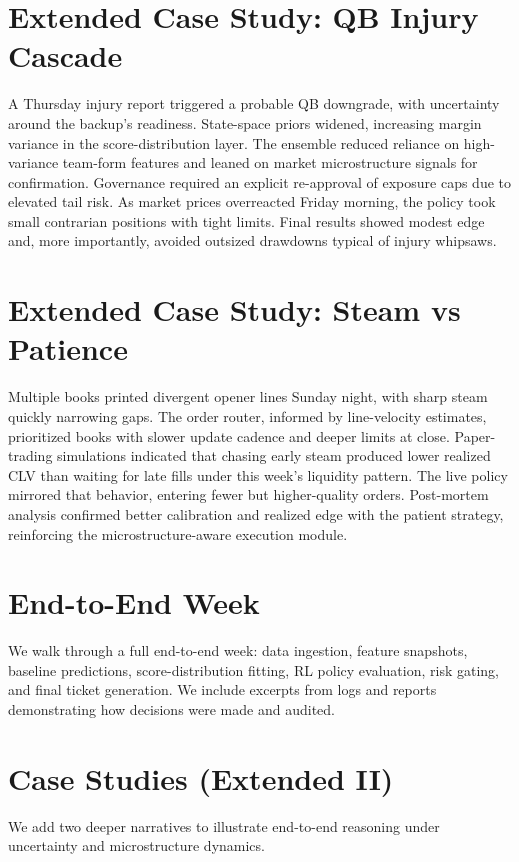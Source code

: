 \section{Extended Case Study: QB Injury Cascade}\label{app:cases-injury}
A Thursday injury report triggered a probable QB downgrade, with uncertainty around the backup's readiness. State-space priors widened, increasing margin variance in the score-distribution layer. The ensemble reduced reliance on high-variance team-form features and leaned on market microstructure signals for confirmation. Governance required an explicit re-approval of exposure caps due to elevated tail risk. As market prices overreacted Friday morning, the policy took small contrarian positions with tight limits. Final results showed modest edge and, more importantly, avoided outsized drawdowns typical of injury whipsaws.

\section{Extended Case Study: Steam vs Patience}\label{app:cases-steam}
Multiple books printed divergent opener lines Sunday night, with sharp steam quickly narrowing gaps. The order router, informed by line-velocity estimates, prioritized books with slower update cadence and deeper limits at close. Paper-trading simulations indicated that chasing early steam produced lower realized CLV than waiting for late fills under this week's liquidity pattern. The live policy mirrored that behavior, entering fewer but higher-quality orders. Post-mortem analysis confirmed better calibration and realized edge with the patient strategy, reinforcing the microstructure-aware execution module.

\section{End-to-End Week}\label{app:cases-endtoend}
We walk through a full end-to-end week: data ingestion, feature snapshots, baseline predictions, score-distribution fitting, RL policy evaluation, risk gating, and final ticket generation. We include excerpts from logs and reports demonstrating how decisions were made and audited.

\section{Case Studies (Extended II)}\label{app:cases-ext2}
We add two deeper narratives to illustrate end-to-end reasoning under uncertainty and microstructure dynamics.

